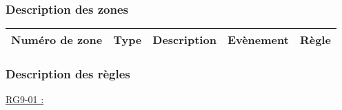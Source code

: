 \documentclass{report}
\begin{document}
		\subsubsection{Description des zones}
		
			\begin{tabular}{|c|c|c|c|c|} \hline
				Numéro de zone & Type  & Description & Evènement &	Règle \\\hline
			\end{tabular}
			
		\subsubsection{Description des règles}

			\underline{RG9-01 :}
				\begin{quote}
				
				\end{quote}
	
\newpage
	
\end{document}
